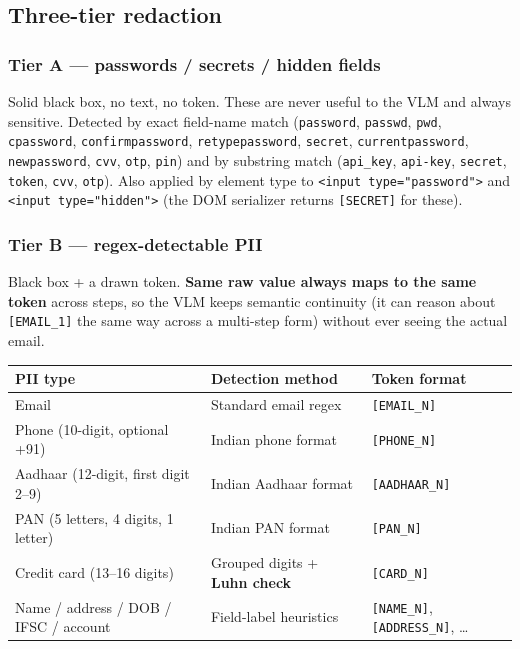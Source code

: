 \documentclass[11pt,a4paper]{article}
\newcommand{\code}[1]{\texttt{#1}}
\begin{document}
\subsection{Three-tier redaction}
\label{sec:redaction}

\subsubsection*{Tier A --- passwords / secrets / hidden fields}
Solid black box, no text, no token. These are never useful to the VLM and always sensitive. Detected by exact field-name match (\code{password}, \code{passwd}, \code{pwd}, \code{cpassword}, \code{confirmpassword}, \code{retypepassword}, \code{secret}, \code{currentpassword}, \code{newpassword}, \code{cvv}, \code{otp}, \code{pin}) and by substring match (\code{api\_key}, \code{api-key}, \code{secret}, \code{token}, \code{cvv}, \code{otp}). Also applied by element type to \code{<input type="password">} and \code{<input type="hidden">} (the DOM serializer returns \code{[SECRET]} for these).

\subsubsection*{Tier B --- regex-detectable PII}
Black box + a drawn token. \textbf{Same raw value always maps to the same token} across steps, so the VLM keeps semantic continuity (it can reason about \code{[EMAIL\_1]} the same way across a multi-step form) without ever seeing the actual email.

\begin{table}[H]
\centering
\small
\begin{tabularx}{\textwidth}{@{}p{3.6cm} X p{3.4cm}@{}}
\toprule
\textbf{PII type} & \textbf{Detection method} & \textbf{Token format}\\
\midrule
Email & Standard email regex & \code{[EMAIL\_N]}\\
Phone (10-digit, optional +91) & Indian phone format & \code{[PHONE\_N]}\\
Aadhaar (12-digit, first digit 2--9) & Indian Aadhaar format & \code{[AADHAAR\_N]}\\
PAN (5 letters, 4 digits, 1 letter) & Indian PAN format & \code{[PAN\_N]}\\
Credit card (13--16 digits) & Grouped digits + \textbf{Luhn check} & \code{[CARD\_N]}\\
Name / address / DOB / IFSC / account & Field-label heuristics & \code{[NAME\_N]}, \code{[ADDRESS\_N]}, \ldots\\
\bottomrule
\end{tabularx}
\end{table}
\end{document}

